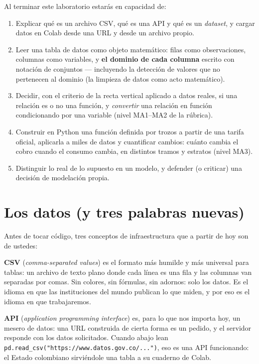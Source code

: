 \documentclass[12pt,letterpaper]{article}
\begin{document}
\begin{cajalogros}
Al terminar este laboratorio estarás en capacidad de:
\begin{enumerate}[label=\arabic*., itemsep=0.1em]
    \item Explicar qué es un archivo CSV, qué es una API y qué es un \emph{dataset}, y cargar datos en Colab desde una URL y desde un archivo propio.
    \item Leer una tabla de datos como objeto matemático: filas como observaciones, columnas como variables, y \textbf{el dominio de cada columna} escrito con notación de conjuntos --- incluyendo la detección de valores que no pertenecen al dominio (la limpieza de datos como acto matemático).
    \item Decidir, con el criterio de la recta vertical aplicado a datos reales, si una relación es o no una función, y \emph{convertir} una relación en función condicionando por una variable (nivel MA1--MA2 de la rúbrica).
    \item Construir en Python una función definida por trozos a partir de una tarifa oficial, aplicarla a miles de datos y cuantificar cambios: cuánto cambia el cobro cuando el consumo cambia, en distintos tramos y estratos (nivel MA3).
    \item Distinguir lo real de lo supuesto en un modelo, y defender (o criticar) una decisión de modelación propia.
\end{enumerate}
\end{cajalogros}

\section{Los datos (y tres palabras nuevas)}
Antes de tocar código, tres conceptos de infraestructura que a partir de hoy son de ustedes:

\textbf{CSV} (\emph{comma-separated values}) es el formato más humilde y más universal para tablas: un archivo de texto plano donde cada línea es una fila y las columnas van separadas por comas. Sin colores, sin fórmulas, sin adornos: solo los datos. Es el idioma en que las instituciones del mundo publican lo que miden, y por eso es el idioma en que trabajaremos.

\textbf{API} (\emph{application programming interface}) es, para lo que nos importa hoy, un mesero de datos: una URL construida de cierta forma es un pedido, y el servidor responde con los datos solicitados. Cuando abajo lean \texttt{pd.read\_csv("https://www.datos.gov.co/...")}, eso es una API funcionando: el Estado colombiano sirviéndole una tabla a su cuaderno de Colab.
\end{document}
